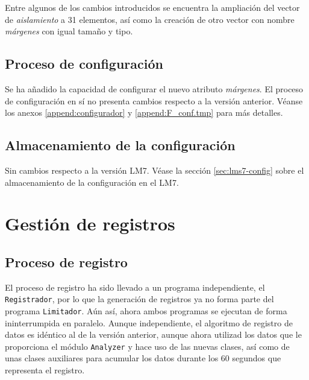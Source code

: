Entre algunos de los cambios introducidos se encuentra la ampliación del vector de \textit{aislamiento} a 31 elementos, así como la creación de otro vector con nombre \textit{márgenes} con igual tamaño y tipo.

\subsection{Proceso de configuración}

Se ha añadido la capacidad de configurar el nuevo atributo \textit{márgenes}. El proceso de configuración en sí no presenta cambios respecto a la versión anterior. Véanse los anexos \ref{append:configurador} y \ref{append:F_conf.tmp} para más detalles.

\subsection{Almacenamiento de la configuración}

Sin cambios respecto a la versión LM7. Véase la sección \ref{sec:lms7-config} sobre el almacenamiento de la configuración en el LM7.

\clearpage
\section{Gestión de registros}

\subsection{Proceso de registro}

El proceso de registro ha sido llevado a un programa independiente, el \verb|Registrador|, por lo que la generación de registros ya no forma parte del programa \verb|Limitador|. Aún así, ahora ambos programas se ejecutan de forma ininterrumpida en paralelo. Aunque independiente, el algoritmo de registro de datos es idéntico al de la versión anterior, aunque ahora utilizad los datos que le proporciona el módulo \verb|Analyzer| y hace uso de las nuevas clases, así como de unas clases auxiliares para acumular los datos durante los 60 segundos que representa el registro. \\

